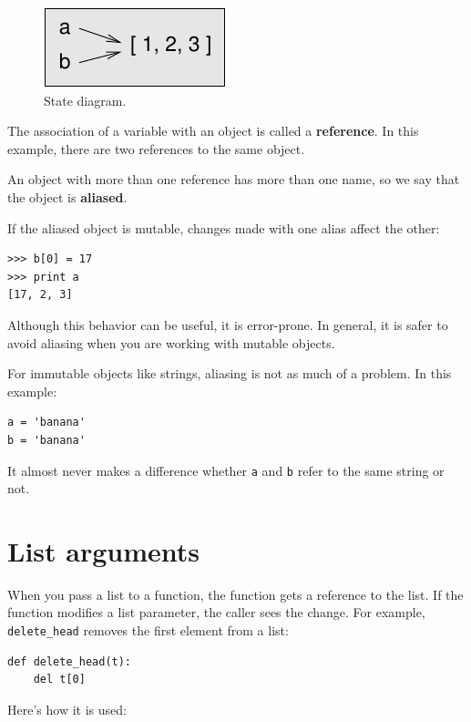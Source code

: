 \documentclass[10pt]{book}
\begin{document}
\begin{CJK}{UTF8}{gbsn}
\begin{figure}
\centerline
{\includegraphics[scale=0.8]{figs/list3.pdf}}
\caption{State diagram.}
\label{fig.list3}
\end{figure}

The association of a variable with an object is called a {\bf
reference}.  In this example, there are two references to the same
object.

An object with more than one reference has more
than one name, so we say that the object is {\bf aliased}.

If the aliased object is mutable, changes made with one alias affect
the other:

\begin{verbatim}
>>> b[0] = 17
>>> print a
[17, 2, 3]
\end{verbatim}
%
Although this behavior can be useful, it is error-prone.  In general,
it is safer to avoid aliasing when you are working with mutable
objects.

For immutable objects like strings, aliasing is not as much of a
problem.  In this example:

\begin{verbatim}
a = 'banana'
b = 'banana'
\end{verbatim}
%
It almost never makes a difference whether {\tt a} and {\tt b} refer
to the same string or not.


\section{List arguments}
\label{list.arguments}

When you pass a list to a function, the function gets a reference
to the list.
If the function modifies a list parameter, the caller sees the change.
For example, \verb"delete_head" removes the first element from a list:

\begin{verbatim}
def delete_head(t):
    del t[0]
\end{verbatim}
%
Here's how it is used:


\end{CJK}
\end{document}
